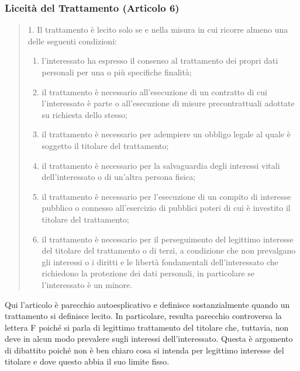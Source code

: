 \subsubsection*{Liceità del Trattamento (Articolo 6)}
\begin{quote}
    1. Il trattamento è lecito solo se e nella misura in cui ricorre almeno una delle seguenti condizioni:
    \begin{enumerate}[label=\alph*)]
        \item l'interessato ha espresso il consenso al trattamento dei propri dati personali per una o più specifiche finalità;
        \item il trattamento è necessario all'esecuzione di un contratto di cui l'interessato è parte o all'esecuzione di misure precontrattuali adottate su richiesta dello stesso;
        \item il trattamento è necessario per adempiere un obbligo legale al quale è soggetto il titolare del trattamento;
        \item il trattamento è necessario per la salvaguardia degli interessi vitali dell'interessato o di un'altra persona fisica;
        \item il trattamento è necessario per l'esecuzione di un compito di interesse pubblico o connesso all'esercizio di pubblici poteri di cui è investito il titolare del trattamento;
        \item il trattamento è necessario per il perseguimento del legittimo interesse del titolare del trattamento o di terzi, a condizione che non prevalgano gli interessi o i diritti e le libertà fondamentali dell'interessato che richiedono la protezione dei dati personali, in particolare se l'interessato è un minore.
    \end{enumerate}
\end{quote}
Qui l'articolo è parecchio autoesplicativo e definisce sostanzialmente quando un trattamento si definisce lecito.
In particolare, resulta parecchio controversa la lettera F poiché si parla di legittimo trattamento del titolare che, tuttavia, non deve in alcun modo prevalere sugli interessi dell'interessato.
Questa è argomento di dibattito poiché non è ben chiaro cosa si intenda per legittimo interesse del titolare e dove questo abbia il suo limite fisso.
